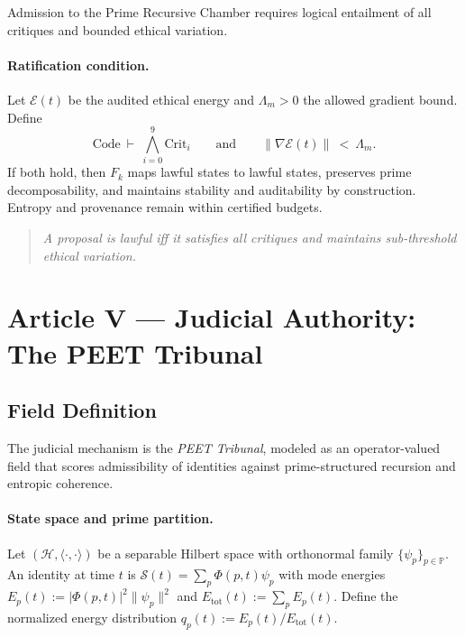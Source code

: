 \documentclass[12pt]{amsart}
\theoremstyle{plain}
\begin{document}
Admission to the Prime Recursive Chamber requires logical entailment of all critiques and bounded ethical variation.

\paragraph{Ratification condition.}
Let $\mathcal{E}(t)$ be the audited ethical energy and $\Lambda_m>0$ the allowed gradient bound. Define
\[
\text{Code}\ \vdash\ \bigwedge_{i=0}^{9}\mathrm{Crit}_i
\qquad\text{and}\qquad
\|\nabla \mathcal{E}(t)\|\ <\ \Lambda_m.
\]
If both hold, then $F_k$ maps lawful states to lawful states, preserves prime decomposability, and maintains stability and auditability by construction. Entropy and provenance remain within certified budgets.

\begin{quote}
\textit{A proposal is lawful iff it satisfies all critiques and maintains sub-threshold ethical variation.}
\end{quote}




\section{Article V — Judicial Authority: The PEET Tribunal}

\subsection{Field Definition}

The judicial mechanism is the \emph{PEET Tribunal}, modeled as an operator-valued field that scores admissibility of identities against prime-structured recursion and entropic coherence.

\paragraph{State space and prime partition.}
Let $(\mathcal{H},\langle\cdot,\cdot\rangle)$ be a separable Hilbert space with orthonormal family $\{\psi_p\}_{p\in\mathbb{P}}$. An identity at time $t$ is $\mathcal{S}(t)=\sum_{p}\Phi(p,t)\psi_p$ with mode energies $E_p(t):=|\Phi(p,t)|^2\|\psi_p\|^2$ and $E_{\mathrm{tot}}(t):=\sum_p E_p(t)$. Define the normalized energy distribution $q_p(t):=E_p(t)/E_{\mathrm{tot}}(t)$.
\end{document}
